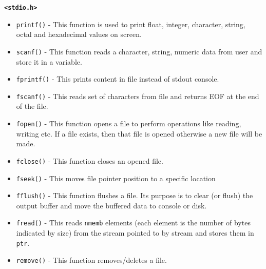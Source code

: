 \documentclass[12pt]{article}
\begin{document}
\noindent \textbf{\texttt{<stdio.h>}}
\begin{itemize}
\item \texttt{printf()} - This function is used to print float, integer, character, string, octal and hexadecimal values on screen.

\item \texttt{scanf()} - This function reads a character, string, numeric data from user and store it in a variable.

\item \texttt{fprintf()} - This prints content in file instead of stdout console.

\item \texttt{fscanf()} - This reads set of characters from file and returns EOF at the end of the file.

\item \texttt{fopen()} - This function opens a file to perform operations like reading, writing etc. If a file exists, then that file is opened otherwise a new file will be made.

\item \texttt{fclose()} - This function closes an opened file.


\item \texttt{fseek()} - This moves file pointer position to a specific location

\item \texttt{fflush()} - This function flushes a file.  Its purpose is to clear (or flush) the output buffer and move the buffered data to console or disk.

\item \texttt{fread()} - This reads \texttt{nmemb} elements (each element is the number of bytes indicated by size) from the stream pointed to by stream and stores them in \texttt{ptr}.

\item \texttt{remove()} - This function removes/deletes a file.



\end{itemize}
\end{document}
